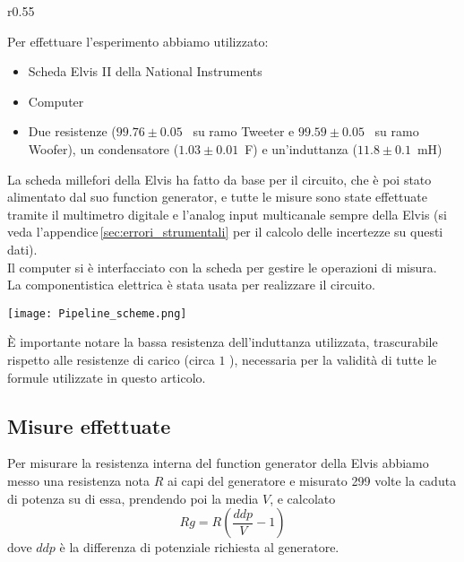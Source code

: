 \documentclass[../Relazione_circuiti]{subfiles}
\begin{document}
\begin{wrapfigure}{r}{0.55\textwidth}

\end{wrapfigure}

\begin{minipage}{.44\textwidth}

  Per effettuare l'esperimento abbiamo utilizzato:
  \begin{itemize}
    \item Scheda Elvis II della National Instruments
    \item Computer
    \item Due resistenze ($99.76 \pm 0.05$~\textOmega \hspace{1pt} su ramo Tweeter e $99.59 \pm 0.05$~\textOmega \hspace{1pt} su ramo Woofer), un condensatore ($1.03 \pm 0.01 $~\textmu F) e un'induttanza ($11.8 \pm 0.1$~mH)
  \end{itemize}

  La scheda millefori della Elvis ha fatto da base per il circuito, che è poi stato alimentato dal suo function
  generator, e tutte le misure sono state effettuate tramite il multimetro digitale e l'analog input multicanale sempre
  della Elvis (si veda l'appendice\,\ref{sec:errori_strumentali} per il calcolo delle incertezze su questi dati).\\
  Il computer si è interfacciato con la scheda per gestire le operazioni di misura. \\
  La componentistica elettrica è stata usata per realizzare il circuito.
\end{minipage}
\hfill
\begin{minipage}{0.55\textwidth}
  \centering
  \texttt{[image: Pipeline\_scheme.png]}
\end{minipage}
È importante notare la bassa resistenza dell'induttanza utilizzata, trascurabile rispetto alle resistenze di carico
(circa $1$ \textOmega), necessaria per la validità di tutte le formule utilizzate in questo articolo.

\subsection{Misure effettuate}\label{subsec:misure-effettuate}

  Per misurare la resistenza interna del function generator della Elvis abbiamo messo una resistenza nota $R$ ai capi
  del generatore e misurato 299 volte la caduta di potenza su di essa, prendendo poi la media $V$, e calcolato
  \begin{equation*}
    Rg = R \left( \frac{ddp}{V} - 1 \right)
  \end{equation*}
  dove $ddp$ è la differenza di potenziale richiesta al generatore. \\
\end{document}
